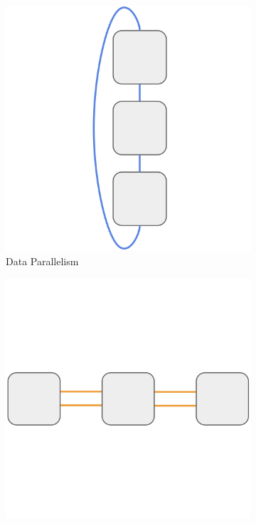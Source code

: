 \documentclass{article}
\begin{document}
\begin{figure}[h]
    \centering
    \begin{subfigure}[b]{0.22\textwidth}
        \centering
        \includegraphics[width=\textwidth]{figures/dp.png}
        \caption{Data Parallelism}
    \end{subfigure}
    \hfill
    \begin{subfigure}[b]{0.22\textwidth}
        \centering
        \includegraphics[width=\textwidth]{figures/pp.png}

\end{subfigure}
\end{figure}
\end{document}
